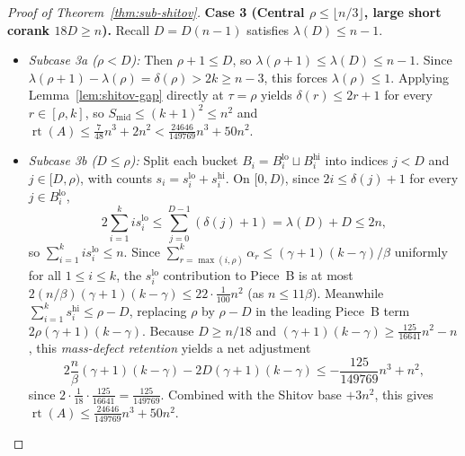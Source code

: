 \documentclass[11pt]{article}
\theoremstyle{definition}
\theoremstyle{remark}
\newcommand{\rt}{\operatorname{rt}}
\begin{document}
\begin{proof}[Proof of Theorem~\ref{thm:sub-shitov}]
\smallskip
\noindent\textbf{Case 3 (Central $\rho \le \lfloor n/3 \rfloor$, large short corank $18 D \ge n$).}
Recall $D = D(n - 1)$ satisfies $\lambda(D) \le n - 1$.
\begin{itemize}[leftmargin=2em]
  \item \emph{Subcase 3a ($\rho < D$):} Then $\rho + 1 \le D$, so $\lambda(\rho + 1) \le \lambda(D) \le n - 1$. Since $\lambda(\rho + 1) - \lambda(\rho) = \delta(\rho) > 2k \ge n - 3$, this forces $\lambda(\rho) \le 1$. Applying Lemma~\ref{lem:shitov-gap} directly at $\tau = \rho$ yields $\delta(r) \le 2r + 1$ for every $r \in [\rho, k]$, so $S_{\mathrm{mid}} \le (k + 1)^2 \le n^2$ and $\rt(A) \le \frac{7}{48} n^3 + 2 n^2 < \frac{24646}{149769} n^3 + 50 n^2$.
  \item \emph{Subcase 3b ($D \le \rho$):} Split each bucket $B_i = B_i^{\mathrm{lo}} \sqcup B_i^{\mathrm{hi}}$ into indices $j < D$ and $j \in [D, \rho)$, with counts $s_i = s_i^{\mathrm{lo}} + s_i^{\mathrm{hi}}$. On $[0, D)$, since $2i \le \delta(j) + 1$ for every $j \in B_i^{\mathrm{lo}}$,
  \[
    2 \sum_{i=1}^{k} i s_i^{\mathrm{lo}} \le \sum_{j = 0}^{D - 1} (\delta(j) + 1) = \lambda(D) + D \le 2n,
  \]
  so $\sum_{i=1}^k i s_i^{\mathrm{lo}} \le n$. Since $\sum_{r=\max(i,\rho)}^k \alpha_r \le (\gamma+1)(k-\gamma) / \beta$ uniformly for all $1 \le i \le k$, the $s_i^{\mathrm{lo}}$ contribution to Piece~B is at most $2(n/\beta)(\gamma+1)(k-\gamma) \le 22 \cdot \frac{1}{100} n^2$ (as $n \le 11 \beta$). Meanwhile $\sum_{i=1}^k s_i^{\mathrm{hi}} \le \rho - D$, replacing $\rho$ by $\rho - D$ in the leading Piece~B term $2\rho(\gamma+1)(k-\gamma)$. Because $D \ge n / 18$ and $(\gamma+1)(k-\gamma) \ge \frac{125}{16641} n^2 - n$, this \emph{mass-defect retention} yields a net adjustment
  \[
    2\frac{n}{\beta}(\gamma + 1)(k - \gamma) - 2 D (\gamma + 1)(k - \gamma)
    \le -\frac{125}{149769} n^3 + n^2,
  \]
  since $2 \cdot \frac{1}{18} \cdot \frac{125}{16641} = \frac{125}{149769}$. Combined with the Shitov base $+3 n^2$, this gives $\rt(A) \le \frac{24646}{149769} n^3 + 50 n^2$.
\end{itemize}


\end{proof}
\end{document}
